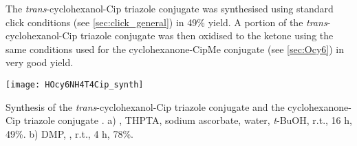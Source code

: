 The \textit{trans}-cyclohexanol-Cip triazole conjugate  was synthesised using standard click conditions (see \ref{sec:click_general}) in 49\% yield.
A portion of the \textit{trans}-cyclohexanol-Cip triazole conjugate  was then oxidised to the ketone using the same conditions used for the cyclohexanone-CipMe conjugate (see \ref{sec:Ocy6}) in very good yield.

\begin{scheme}[H]
	\begin{center}
		\texttt{[image: HOcy6NH4T4Cip\_synth]}
		\caption{Synthesis of the \textit{trans}-cyclohexanol-Cip triazole conjugate  and the cyclohexanone-Cip triazole conjugate . 
		a) , THPTA, sodium ascorbate, water, \textit{t}-BuOH, r.t., 16 h, 49\%. 
		b) DMP, , r.t., 4 h, 78\%.
		\label{sch:HOcy6NH4T4Cip_synth}}
	\end{center}
\end{scheme}